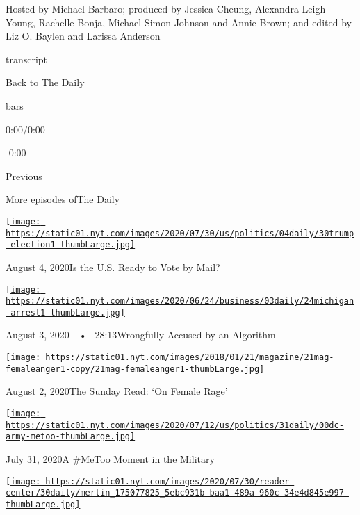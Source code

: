 Hosted by Michael Barbaro; produced by Jessica Cheung, Alexandra Leigh
Young, Rachelle Bonja, Michael Simon Johnson and Annie Brown; and edited
by Liz O. Baylen and Larissa Anderson

transcript

Back to The Daily

bars

0:00/0:00

-0:00

Previous

More episodes ofThe Daily

\href{https://www.nytimes.com/2020/08/04/podcasts/the-daily/mail-in-voting-president-trump.html?action=click\&module=audio-series-bar\&region=header\&pgtype=Article}{\texttt{[image: https://static01.nyt.com/images/2020/07/30/us/politics/04daily/30trump-election1-thumbLarge.jpg]}}

August 4, 2020Is the U.S. Ready to Vote by Mail?

\href{https://www.nytimes.com/2020/08/03/podcasts/the-daily/algorithmic-justice-racism.html?action=click\&module=audio-series-bar\&region=header\&pgtype=Article}{\texttt{[image: https://static01.nyt.com/images/2020/06/24/business/03daily/24michigan-arrest1-thumbLarge.jpg]}}

August 3, 2020~~•~ 28:13Wrongfully Accused by an Algorithm

\href{https://www.nytimes.com/2020/08/02/podcasts/the-daily/on-female-rage.html?action=click\&module=audio-series-bar\&region=header\&pgtype=Article}{\texttt{[image: https://static01.nyt.com/images/2018/01/21/magazine/21mag-femaleanger1-copy/21mag-femaleanger1-thumbLarge.jpg]}}

August 2, 2020The Sunday Read: `On Female Rage'

\href{https://www.nytimes.com/2020/07/31/podcasts/the-daily/vanessa-guillen-military-metoo.html?action=click\&module=audio-series-bar\&region=header\&pgtype=Article}{\texttt{[image: https://static01.nyt.com/images/2020/07/12/us/politics/31daily/00dc-army-metoo-thumbLarge.jpg]}}

July 31, 2020A \#MeToo Moment in the Military

\href{https://www.nytimes.com/2020/07/30/podcasts/the-daily/congress-facebook-amazon-google-apple.html?action=click\&module=audio-series-bar\&region=header\&pgtype=Article}{\texttt{[image: https://static01.nyt.com/images/2020/07/30/reader-center/30daily/merlin\_175077825\_5ebc931b-baa1-489a-960c-34e4d845e997-thumbLarge.jpg]}}


